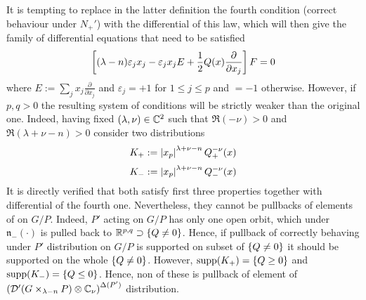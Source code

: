 \documentclass[10pt]{article} %
\newcommand{\D}{\mathcal{D}}
\theoremstyle{definition}
\theoremstyle{remark}
\begin{document}
It is tempting to replace in the latter definition
the fourth condition (correct behaviour under $N_+'$) with the differential of this
law, which will then give the family of differential equations that need to be satisfied
\begin{equation}
\left[(\lambda-n)\varepsilon_jx_j-\varepsilon_jx_jE+\frac{ 1 }{ 2 }Q(x)\frac{ \partial}{ \partial x_j } \right]F=0
	\label{Ndiff}
\end{equation}
where $E:=\sum_j x_j\frac{ \partial }{ \partial x_j }$ and $\varepsilon_j=+1$ for $1\leq j\leq p$ and $=-1$ otherwise.
However, if $p,q>0$ the resulting system of conditions will be strictly weaker than the original one. Indeed, having
fixed $(\lambda,\nu)\in\mathbb{C}^2$ such that $\Re(-\nu)>0$ and $\Re(\lambda+\nu-n)>0$ consider two distributions
\[K_+:=\left| x_p \right|^{ \lambda+\nu-n }Q_+^{ -\nu }(x)\]
\[K_-:=\left| x_p \right|^{ \lambda+\nu-n }Q_-^{ -\nu }(x)\]
It is directly verified that both satisfy first three properties together with differential of the fourth one. Nevertheless,
they cannot be pullbacks of elements of \sone on $G/P$. Indeed, $P'$ acting on $G/P$
has only one open orbit, which under $\mathfrak{n}_-(\cdot)$ is pulled back to $\mathbb{R}^{ p,q }\supset\left\{ Q\neq0 \right\}$.
Hence, if pullback of correctly behaving under $P'$ distribution on $G/P$ is supported on subset of $\left\{ Q\neq0 \right\}$
it should be supported on the whole $\left\{ Q\neq0 \right\}$. However, $\operatorname{supp}(K_+)=\left\{ Q\geq0 \right\}$ and
$\operatorname{supp}(K_-)=\left\{ Q\leq0 \right\}$. Hence, non of these is pullback of element of 
$\mybra{\D'(G\times_{\lambda-n} P)\otimes\C_\nu}^{\Delta(P')}$ distribution.
\end{document}
